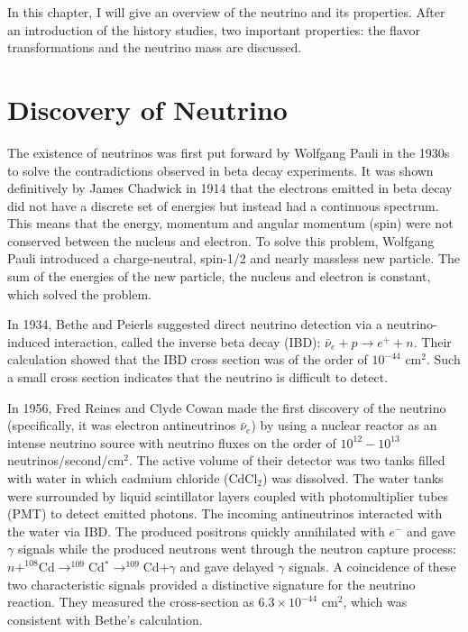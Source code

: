 
In this chapter, I will give an overview of the neutrino and its properties. After an introduction of the history studies, two important properties: the flavor transformations and the neutrino mass are discussed. %

\section{Discovery of Neutrino}
The existence of neutrinos was first put forward by Wolfgang Pauli in the 1930s to solve the contradictions observed in beta decay experiments. It was shown definitively by James Chadwick in 1914 that the electrons emitted in beta decay did not have a discrete set of energies but instead had a continuous spectrum\cite{leite1996weak}. This means that the energy, momentum and angular momentum (spin) were not conserved between the nucleus and electron. To solve this problem, Wolfgang Pauli introduced a charge-neutral, spin-1/2 and nearly massless new particle. The sum of the energies of the new particle, the nucleus and electron is constant, which solved the problem. 

In 1934, Bethe and Peierls suggested direct neutrino detection via a neutrino-induced interaction, called the inverse beta decay (IBD): $\bar{\nu}_e+p\to e^+ + n$. Their calculation showed that the IBD cross section was of the order of $10^{-44}$ cm$^2$. Such a small cross section indicates that the neutrino is difficult to detect\cite{bethe1934neutrino}.

In 1956, Fred Reines and Clyde Cowan made the first discovery of the neutrino (specifically, it was electron antineutrinos $\bar{\nu}_e$) by using a nuclear reactor as an intense neutrino source with neutrino fluxes on the order of $10^{12}-10^{13}$ neutrinos/second/cm$^2$. The active volume of their detector was two tanks filled with water in which cadmium chloride (CdCl$_2$) was dissolved. The water tanks were surrounded by liquid scintillator layers coupled with photomultiplier tubes (PMT) to detect emitted photons. The incoming antineutrinos interacted with the water via IBD. The produced positrons quickly annihilated with $e^-$ and gave $\gamma$ signals while the produced neutrons went through the neutron capture process: $n+^{108}$Cd$\to^{109}$Cd$^*\to^{109}$Cd$+\gamma$ and gave delayed $\gamma$ signals. A coincidence of these two characteristic signals provided a distinctive signature for the neutrino reaction. They measured the cross-section as $6.3\times10^{-44}$ cm$^2$, which was consistent with Bethe's calculation\cite{reines1960detection}.

